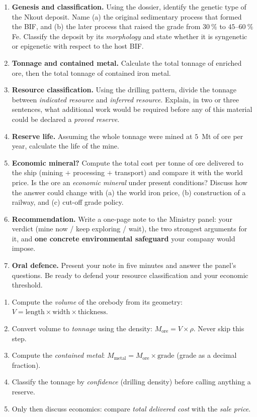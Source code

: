 \documentclass[11pt]{article}
\begin{document}
\begin{enumerate}
\item \textbf{Genesis and classification.} Using the dossier, identify the genetic type of the Nkout deposit. Name (a) the original sedimentary process that formed the BIF, and (b) the later process that raised the grade from $30\ \%$ to $45$--$60\ \%$ Fe. Classify the deposit by its \emph{morphology} and state whether it is syngenetic or epigenetic with respect to the host BIF.
\item \textbf{Tonnage and contained metal.} Calculate the total tonnage of enriched ore, then the total tonnage of contained iron metal.
\item \textbf{Resource classification.} Using the drilling pattern, divide the tonnage between \emph{indicated resource} and \emph{inferred resource}. Explain, in two or three sentences, what additional work would be required before any of this material could be declared a \emph{proved reserve}.
\item \textbf{Reserve life.} Assuming the whole tonnage were mined at $5$~Mt of ore per year, calculate the life of the mine.
\item \textbf{Economic mineral?} Compute the total cost per tonne of ore delivered to the ship (mining $+$ processing $+$ transport) and compare it with the world price. Is the ore an \emph{economic mineral} under present conditions? Discuss how the answer could change with (a) the world iron price, (b) construction of a railway, and (c) cut-off grade policy.
\item \textbf{Recommendation.} Write a one-page note to the Ministry panel: your verdict (mine now / keep exploring / wait), the two strongest arguments for it, and \textbf{one concrete environmental safeguard} your company would impose.
\item \textbf{Oral defence.} Present your note in five minutes and answer the panel's questions. Be ready to defend your resource classification and your economic threshold.
\end{enumerate}

\begin{methode}
\begin{enumerate}
\item Compute the \emph{volume} of the orebody from its geometry: $V = \text{length} \times \text{width} \times \text{thickness}$.
\item Convert volume to \emph{tonnage} using the density: $M_{\text{ore}} = V \times \rho$. Never skip this step.
\item Compute the \emph{contained metal}: $M_{\text{metal}} = M_{\text{ore}} \times \text{grade}$ (grade as a decimal fraction).
\item Classify the tonnage by \emph{confidence} (drilling density) before calling anything a reserve.
\item Only then discuss economics: compare \emph{total delivered cost} with the \emph{sale price}.
\end{enumerate}
\end{methode}
\end{document}
